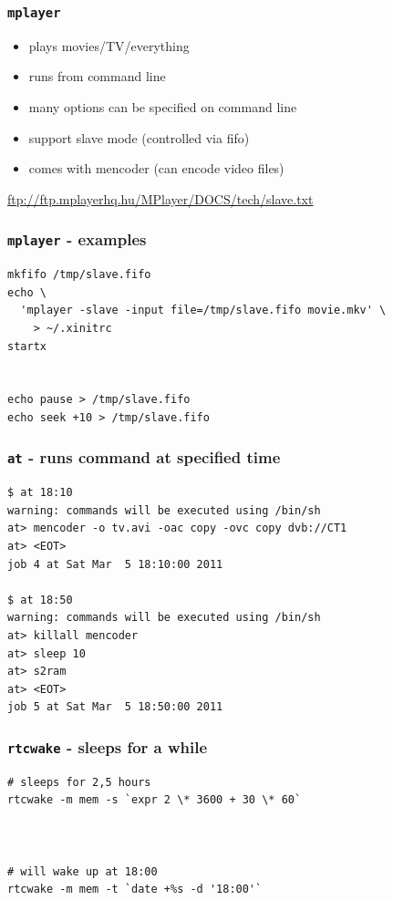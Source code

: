 \documentclass{beamer}
\begin{document}

\begin{frame}[t,fragile]
	\frametitle{\texttt{mplayer}}
	\begin{itemize}
		\item plays movies/TV/everything
		\item runs from command line
		\item many options can be specified on command line
		\item support slave mode (controlled via fifo)
		\item comes with mencoder (can encode video files)
	\end{itemize}
	\vfill

	\hfill \textcolor{blue}{\href{ftp://ftp.mplayerhq.hu/MPlayer/DOCS/tech/slave.txt}{ftp://ftp.mplayerhq.hu/MPlayer/DOCS/tech/slave.txt}}
\end{frame}

\begin{frame}[fragile]
	\frametitle{\texttt{mplayer} - examples}
	\begin{verbatim}
mkfifo /tmp/slave.fifo
echo \
  'mplayer -slave -input file=/tmp/slave.fifo movie.mkv' \
    > ~/.xinitrc
startx


echo pause > /tmp/slave.fifo
echo seek +10 > /tmp/slave.fifo
	\end{verbatim}
\end{frame}

\begin{frame}[t,fragile]
	\frametitle{\texttt{at} - runs command at specified time}
	\begin{verbatim}
$ at 18:10
warning: commands will be executed using /bin/sh
at> mencoder -o tv.avi -oac copy -ovc copy dvb://CT1
at> <EOT>
job 4 at Sat Mar  5 18:10:00 2011

$ at 18:50
warning: commands will be executed using /bin/sh
at> killall mencoder
at> sleep 10
at> s2ram
at> <EOT>
job 5 at Sat Mar  5 18:50:00 2011
	\end{verbatim}
\end{frame}

\begin{frame}[fragile]
	\frametitle{\texttt{rtcwake} - sleeps for a while}
	\begin{verbatim}
# sleeps for 2,5 hours
rtcwake -m mem -s `expr 2 \* 3600 + 30 \* 60`



# will wake up at 18:00
rtcwake -m mem -t `date +%s -d '18:00'`
	\end{verbatim}
\end{frame}
\end{document}
